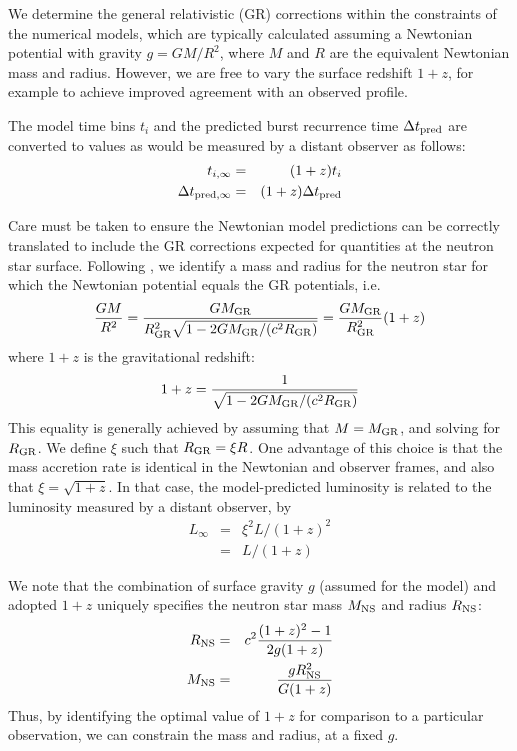 \documentclass{aastex61}
\begin{document}
We determine the general relativistic (GR) corrections within the constraints of the numerical models, which are typically calculated assuming a Newtonian potential with gravity $g=GM/R^2$, where $M$ and $R$ are the equivalent Newtonian mass and radius.
%
However, we are free to vary the surface redshift $1+z$, for example to achieve improved agreement with an observed profile. 

The model time bins  $t_i$ and the predicted burst recurrence time $\Delta t_{\rm pred}$ are converted to values as would be measured by a distant observer as follows:
\begin{eqnarray}
t_{i,\infty} & = & (1+z)t_i \\
\Delta t_{{\rm pred},\infty} & = & (1+z)\Delta t_{\rm pred}
\end{eqnarray}

Care must be taken to ensure the Newtonian model predictions can be correctly translated to include the GR corrections expected for quantities at the neutron star surface.
%
Following \cite{lampe16}, 
we identify a mass and radius for the neutron star for which the Newtonian potential equals the GR potentials, i.e.
\begin{equation}
\frac{GM}{R^2} = \frac{GM_{\rm GR}}{R^2_{\rm GR}\sqrt{1-2GM_{\rm GR}/(c^2R_{\rm GR})}} = \frac{GM_{\rm GR}}{R^2_{\rm GR}}(1+z)
\end{equation}
where $1+z$ is the gravitational redshift:
\begin{equation}
1+z = \frac{1}{\sqrt{1-2GM_{\rm GR}/(c^2R_{\rm GR})}}
\end{equation}
This equality is generally achieved by assuming that $M=M_{\rm GR}$, and solving for $R_{\rm GR}$. 
We define $\xi$ such that $R_{\rm GR}=\xi R$. 
One advantage of this choice is that the mass accretion rate is identical in the Newtonian and observer frames, and also that $\xi = \sqrt{1 + z}$. In that case, the model-predicted luminosity is related to the luminosity measured by a distant observer, by 
\begin{eqnarray}
L_\infty & = & \xi^2L/(1+z)^2 \nonumber \\
& = & L/(1+z)
\end{eqnarray}

We note that the combination of surface gravity $g$ (assumed for the model) and adopted $1+z$  uniquely specifies the neutron star mass $M_{\rm NS}$ and radius $R_{\rm NS}$:
\begin{eqnarray}
R_{\rm NS} &=& c^2\frac{(1+z)^2-1}{2g(1+z)}\\
M_{\rm NS} &=& \frac{gR_{\rm NS}^2}{G(1+z)}
\end{eqnarray}
Thus, by identifying the optimal value of $1+z$ for comparison to a particular observation, we can constrain the mass and radius, at a fixed $g$.
\end{document}
